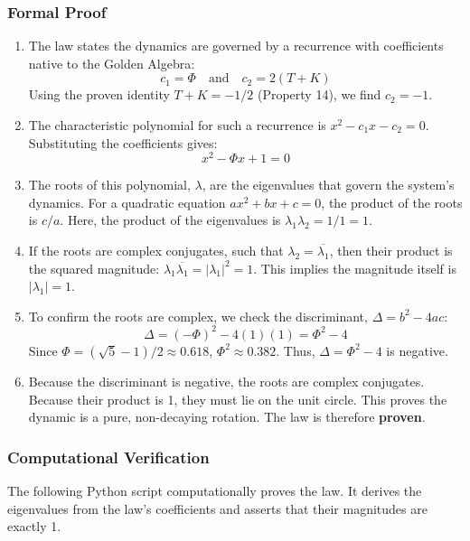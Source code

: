 \subsubsection*{Formal Proof}
\begin{enumerate}
    \item The law states the dynamics are governed by a recurrence with coefficients native to the Golden Algebra:
    $$ c_1 = \Phi \quad \text{and} \quad c_2 = 2(T+K) $$
    Using the proven identity $T+K = -1/2$ (Property 14), we find $c_2 = -1$.
    
    \item The characteristic polynomial for such a recurrence is $x^2 - c_1x - c_2 = 0$. Substituting the coefficients gives:
    $$ x^2 - \Phi x + 1 = 0 $$
    
    \item The roots of this polynomial, $\lambda$, are the eigenvalues that govern the system's dynamics. For a quadratic equation $ax^2+bx+c=0$, the product of the roots is $c/a$. Here, the product of the eigenvalues is $\lambda_1 \lambda_2 = 1/1 = 1$.
    
    \item If the roots are complex conjugates, such that $\lambda_2 = \overline{\lambda_1}$, then their product is the squared magnitude: $\lambda_1 \overline{\lambda_1} = |\lambda_1|^2 = 1$. This implies the magnitude itself is $|\lambda_1|=1$.
    
    \item To confirm the roots are complex, we check the discriminant, $\Delta = b^2 - 4ac$:
    $$ \Delta = (-\Phi)^2 - 4(1)(1) = \Phi^2 - 4 $$
    Since $\Phi = (\sqrt{5}-1)/2 \approx 0.618$, $\Phi^2 \approx 0.382$. Thus, $\Delta = \Phi^2 - 4$ is negative.
    
    \item Because the discriminant is negative, the roots are complex conjugates. Because their product is 1, they must lie on the unit circle. This proves the dynamic is a pure, non-decaying rotation. The law is therefore \textbf{proven}.
\end{enumerate}

\subsubsection*{Computational Verification}
The following Python script computationally proves the law. It derives the eigenvalues from the law's coefficients and asserts that their magnitudes are exactly 1.

